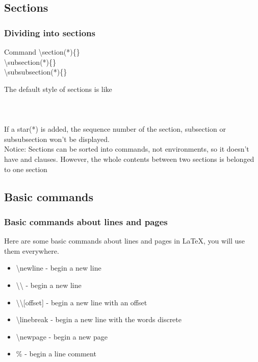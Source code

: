\documentclass{beamer}
\newenvironment{command}{\begin{block}{Command}}{\end{block}}
\begin{document}
\subsection{Sections}

\begin{frame}
	\frametitle{Dividing into sections}
	\begin{command}
		\alert{\textbackslash section(*)}\{\}\\
		\alert{\textbackslash subsection(*)}\{\}\\
		\alert{\textbackslash subsubsection(*)}\{\}\\
	\end{command}
	The default style of sections is like\\
	\\
	\\
	\\[0.5em]
	If a star(\alert{*}) is added, the sequence number of the section, subsection or subsubsection won't be displayed.\\
	\alert{Notice:} Sections can be sorted into commands, not environments, so it doesn't have  and  clauses. However, the whole contents between two sections is belonged to one section
\end{frame}

\subsection{Basic commands}

\begin{frame}
	\frametitle{Basic commands about lines and pages}
	Here are some basic commands about lines and pages in \LaTeX, you will use them everywhere.
	\begin{itemize}
		\item \alert{\textbackslash newline} - begin a new line
		\item \alert{\textbackslash\textbackslash} - begin a new line
		\item \alert{\textbackslash\textbackslash[offset]} - begin a new line with an offset
		\item \alert{\textbackslash linebreak} - begin a new line with the words discrete
		\item \alert{\textbackslash newpage} - begin a new page
		\item \alert{\%} - begin a line comment
	\end{itemize}
\end{frame}
\end{document}
